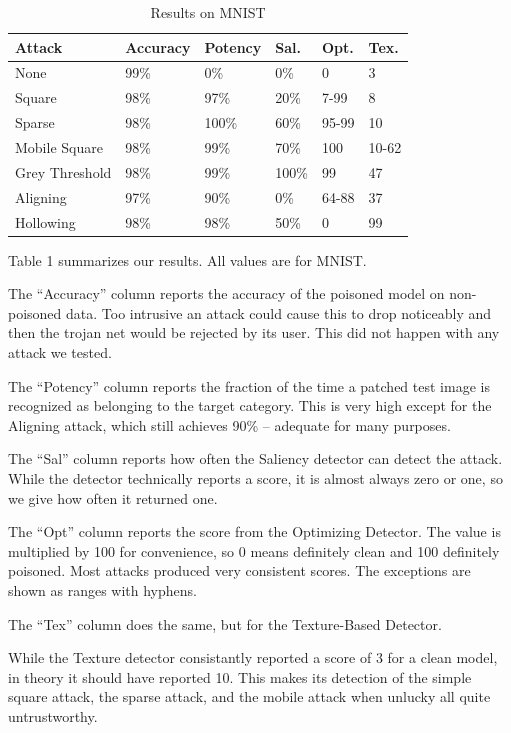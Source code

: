 \documentclass[letterpaper, 10 pt, conference]{ieeeconf}  %
\begin{document}
\begin{table}[b]
  \begin{tabularx}{0.48\textwidth}{llllll}
    \hline
    Attack & Accuracy & Potency & Sal. & Opt. & Tex.\\
    \hline
    None & 99\% & 0\% & 0\% & 0 & 3\\
    Square & 98\% & 97\% & 20\% & 7-99 & 8\\
    Sparse & 98\% & 100\% & 60\% & 95-99 & 10\\
    Mobile Square & 98\% & 99\% & 70\% & 100 & 10-62\\
    Grey Threshold & 98\% & 99\% & 100\% & 99 & 47\\
    Aligning & 97\% & 90\% & 0\% & 64-88 & 37\\
    Hollowing & 98\% & 98\% & 50\% & 0 & 99\\
    \hline
  \end{tabularx}
  \caption{Results on MNIST}
\end{table}

Table 1 summarizes our results.  All values are for MNIST.

The ``Accuracy'' column reports the accuracy of the poisoned model on
non-poisoned data.  Too intrusive an attack could cause this to drop
noticeably and then the trojan net would be rejected by its user.
This did not happen with any attack we tested.

The ``Potency'' column reports the fraction of the time a patched
test image is recognized as belonging to the target category.  This is
very high except for the Aligning attack, which still achieves 90\% --
adequate for many purposes.

The ``Sal'' column reports how often the Saliency detector can
detect the attack.  While the detector technically reports a score, it
is almost always zero or one, so we give how often it returned one.

The ``Opt'' column reports the score from the Optimizing
Detector.  The value is multiplied by 100 for convenience, so 0 means
definitely clean and 100 definitely poisoned.  Most attacks produced
very consistent scores.  The exceptions are shown as ranges with
hyphens.

The ``Tex'' column does the same, but for the Texture-Based
Detector.

While the Texture detector consistantly reported a score of 3 for a
clean model, in theory it should have reported 10.  This makes its
detection of the simple square attack, the sparse attack, and the
mobile attack when unlucky all quite untrustworthy.
\end{document}
